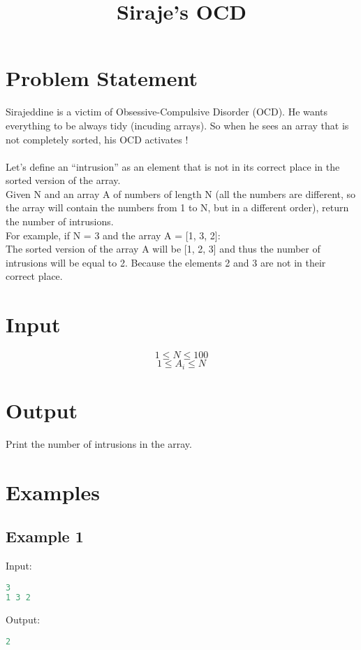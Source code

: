 \documentclass[10pt]{article}
\begin{document}
\title{Siraje's OCD}
 \date{}
\maketitle
\section{Problem Statement}
Sirajeddine is a victim of Obsessive-Compulsive Disorder (OCD). He wants everything to be always tidy (incuding arrays). So when he sees an array that is not completely sorted, his OCD activates !\\
\\
Let’s define an “intrusion” as an element that is not in its correct place in the sorted version of the array.\\
Given N and an array A of numbers of length N (all the numbers are different, so the array will contain the numbers from 1 to N, but in a different order), return the number of intrusions.
\\For example, if N = 3 and the array A = [1, 3, 2]:\\
The sorted version of the array A will be [1, 2, 3] and thus the number of intrusions will be equal to 2. Because the elements 2 and 3 are not in their correct place.
\paragraph{}
\section{Input}
$$ 1\le N \le 100 $$
$$ 1\le A_i \le N $$
\section{Output}
Print the number of intrusions in the array.
\section{Examples}
\subsection{Example 1}
Input:
\begin{lstlisting}[language=Python]
3
1 3 2
\end{lstlisting}
Output:
\begin{lstlisting}[language=Python]
2
\end{lstlisting}
\end{document}
